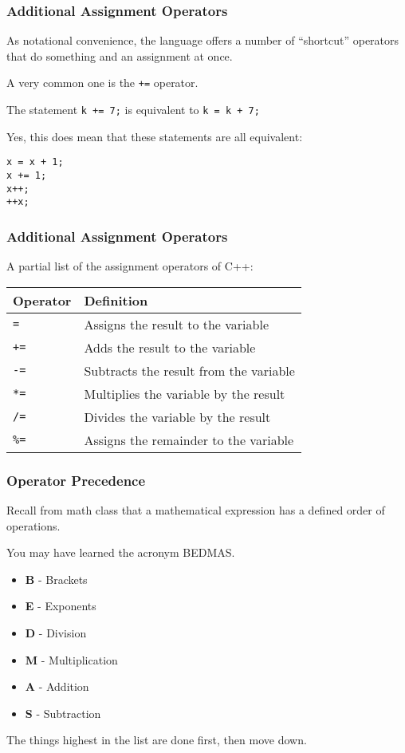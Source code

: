 \begin{frame}[fragile]
\frametitle{Additional Assignment Operators}

As notational convenience, the language offers a number of ``shortcut'' operators that do something and an assignment at once.

A very common one is the \texttt{+=} operator.

The statement \texttt{k += 7;} is equivalent to \texttt{k = k + 7;}

Yes, this does mean that these statements are all equivalent:
\vspace{-3em}

\begin{verbatim}
x = x + 1;
x += 1;
x++;
++x;
\end{verbatim}

\end{frame}

\begin{frame}
\frametitle{Additional Assignment Operators}

A partial list of the assignment operators of C++:

\begin{center}
\begin{tabular}{l|l}
\textbf{Operator} & \textbf{Definition} \\ \hline
	\texttt{=} & Assigns the result to the variable\\ \hline
	\texttt{+=} & Adds the result to the variable\\ \hline
	\texttt{-=} & Subtracts the result from the variable\\ \hline
	\texttt{*=} & Multiplies the variable by the result\\ \hline
	\texttt{/=} & Divides the variable by the result\\ \hline
	\texttt{\%=} & Assigns the remainder to the variable\\ 
\end{tabular}
\end{center}

\end{frame}

\begin{frame}
\frametitle{Operator Precedence}

Recall from math class that a mathematical expression has a defined order of operations. 

You may have learned the acronym BEDMAS.

\begin{itemize}
	\item \textbf{B} - Brackets
	\item \textbf{E} - Exponents
	\item \textbf{D} - Division
	\item \textbf{M} - Multiplication
	\item \textbf{A} - Addition
	\item \textbf{S} - Subtraction
\end{itemize}

The things highest in the list are done first, then move down.

\end{frame}

